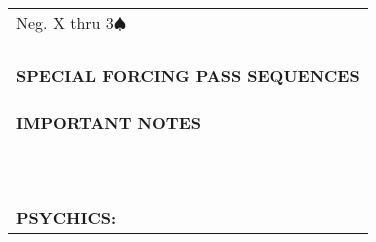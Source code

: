 \documentclass{article}
\renewcommand\S{\ensuremath{\spadesuit}}
\begin{document}
\begin{minipage}{90mm}
\begin{tabular}{| p{88mm} |}
		\\ \hline
		\\ \hline
                Neg. X thru 3\S\
		\\ \hline
		\\ \hline
		\\ \hline
		\\ \hline
		\\ \hline
		\textbf{SPECIAL FORCING PASS SEQUENCES} \\ \hline
		\\ \hline
		\\ \hline
		\\ \hline
		\textbf{IMPORTANT NOTES} \\ \hline
		\\ \hline
		\\ \hline
		\\ \hline
		\\ \hline
		\\ \hline
		\\ \hline
		\\ \hline
		\\ \hline
		\\ \hline
		\\ \hline
		\\ \hline
		\textbf{PSYCHICS:} \\ \hline
	\end{tabular}
\end{minipage}
\end{document}
